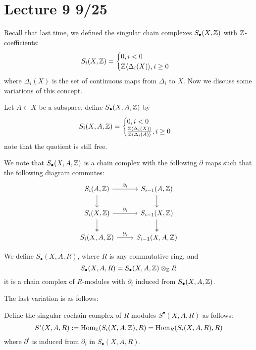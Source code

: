 \section{Lecture 9 9/25}
Recall that last time, we defined the singular chain complexes $S_\bullet(X,\mathbb{Z})$ with $\mathbb{Z}$-coefficients:
\begin{equation*}
    S_i(X,\mathbb{Z})=\begin{cases}
        0, i<0\\
        \mathbb{Z}\langle\Delta_i(X)\rangle, i\geq 0
    \end{cases}
\end{equation*}
where $\Delta_i(X)$ is the set of continuous maps from $\Delta_i$ to $X$. Now we discuss some variations of this concept.
\begin{defn}
    Let $A\subset X$ be a subspace, define $S_\bullet(X,A,\mathbb{Z})$ by 
    \begin{equation*}
        S_i(X,A,\mathbb{Z})=\begin{cases}
            0, i<0\\
            \frac{\mathbb{Z}\langle\Delta_i(X)\rangle}{\mathbb{Z}\langle\Delta_i(A)\rangle}, i\geq 0
        \end{cases}
    \end{equation*}
    note that the quotient is still free.
\end{defn}
We note that $S_\bullet(X,A,\mathbb{Z})$ is a chain complex with the following $\partial$ maps such that the following diagram commutes:
\[\begin{tikzcd}
	{S_i(A,\Z)} & {S_{i-1}(A,\Z)} \\
	{S_i(X,\Z)} & {S_{i-1}(X,\Z)} \\
	{S_i(X,A,\Z)} & {S_{i-1}(X,A,\Z)}
	\arrow["{\partial_i}", from=1-1, to=1-2]
	\arrow[from=1-1, to=2-1]
	\arrow[from=1-2, to=2-2]
	\arrow["{\partial_i}", from=2-1, to=2-2]
	\arrow[two heads, from=2-1, to=3-1]
	\arrow[two heads, from=2-2, to=3-2]
	\arrow["{\partial_i}", from=3-1, to=3-2]
\end{tikzcd}\]
\begin{defn}[$S_\bullet(X,A,R)$]
    We define $S_\bullet(X,A,R)$, where $R$ is any commutative ring, and 
    \begin{equation*}
        S_\bullet(X,A,R)=S_\bullet(X,A,\mathbb{Z})\otimes_{\mathbb{Z}} R
    \end{equation*}
    it is a chain complex of $R$-modules with $\partial_i$ induced from $S_\bullet(X,A,\mathbb{Z})$.
\end{defn}
The last variation is as follows:
\begin{defn}
    Define the singular cochain complex of $R$-modules $S^\bullet(X,A,R)$ as follows:
    \begin{equation*}
        S^i(X,A,R):=\text{Hom}_{\mathbb{Z}}(S_i(X,A,\mathbb{Z}),R)=\text{Hom}_R(S_i(X,A,R),R)
    \end{equation*}
    where $\partial^i$ is induced from $\partial_i$ in $S_\bullet(X,A,R)$.
\end{defn}
